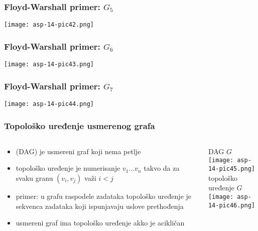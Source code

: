 \documentclass[compress,aspectratio=169]{beamer}
\begin{document}
\begin{frame}[fragile]
  \frametitle{Floyd-Warshall primer: $G_5$}
  \begin{center}
    \texttt{[image: asp-14-pic42.png]}
  \end{center}
\end{frame}

\begin{frame}[fragile]
  \frametitle{Floyd-Warshall primer: $G_6$}
  \begin{center}
    \texttt{[image: asp-14-pic43.png]}
  \end{center}
\end{frame}

\begin{frame}[fragile]
  \frametitle{Floyd-Warshall primer: $G_7$}
  \begin{center}
    \texttt{[image: asp-14-pic44.png]}
  \end{center}
\end{frame}

\begin{frame}[fragile]
  \frametitle{Topološko uređenje usmerenog grafa}
  \begin{columns}
    \begin{column}[t]{6cm}
      \begin{itemize}
        \item {} (DAG) je usmereni graf 
          koji nema petlje
        \item topološko uređenje je numerisanje $v_{1} \ldots v_{n}$
          takvo da za svaku granu $(v_{i},v_{j})$ važi $i<j$
        \item primer: u grafu raspodele zadataka topološko uređenje je
          sekvenca zadataka koji ispunjavaju uslove prethođenja
        \item usmereni graf ima topološko uređenje akko je acikličan
      \end{itemize}
    \end{column}
    \begin{column}[t]{6cm}
      \begin{center}
        \hfill DAG $G$ \\
        \texttt{[image: asp-14-pic45.png]} \\ 
        \hfill topološko uređenje $G$ \\
        \texttt{[image: asp-14-pic46.png]}
      \end{center}
    \end{column}
  \end{columns}
\end{frame}
\end{document}
